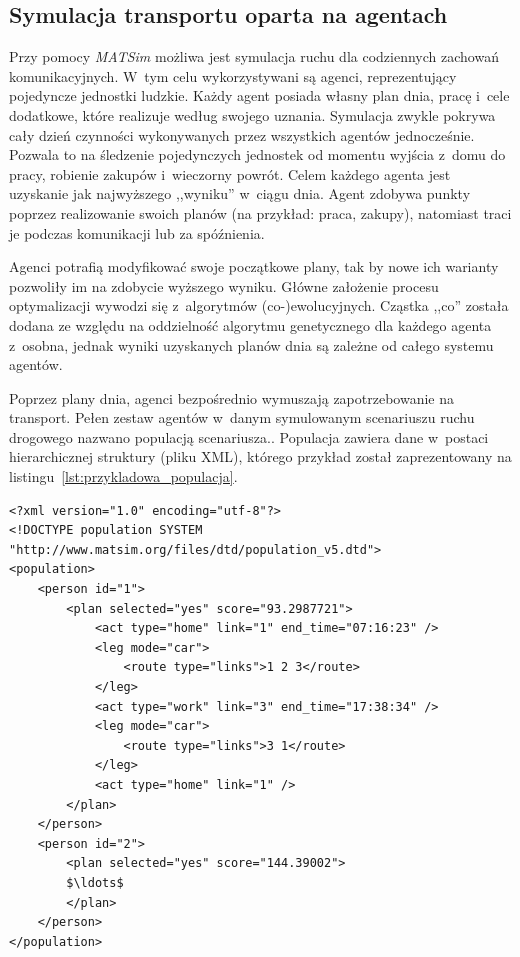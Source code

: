 \documentclass[twoside,12pt]{report}
\begin{document}
\subsection{Symulacja transportu oparta na agentach}\label{rozdz.agenci}
Przy pomocy \textit{MATSim} możliwa jest symulacja ruchu dla codziennych zachowań komunikacyjnych. W~tym celu wykorzystywani są agenci, reprezentujący pojedyncze jednostki ludzkie. Każdy agent posiada własny plan dnia, pracę i~cele dodatkowe, które realizuje według swojego uznania. Symulacja zwykle pokrywa cały dzień czynności wykonywanych przez wszystkich agentów jednocześnie. Pozwala to na śledzenie pojedynczych jednostek od momentu wyjścia z~domu do pracy, robienie zakupów i~wieczorny powrót. Celem każdego agenta jest uzyskanie jak najwyższego ,,wyniku'' w~ciągu dnia. Agent zdobywa punkty poprzez realizowanie swoich planów (na przykład: praca, zakupy), natomiast traci je podczas komunikacji lub za spóźnienia.

Agenci potrafią modyfikować swoje początkowe plany, tak by nowe ich warianty pozwoliły im na zdobycie wyższego wyniku. Główne założenie procesu optymalizacji wywodzi się z~algorytmów (co-)ewolucyjnych. Cząstka ,,co'' została dodana ze względu na oddzielność algorytmu genetycznego dla każdego agenta z~osobna, jednak wyniki uzyskanych planów dnia są zależne od całego systemu agentów. 

Poprzez plany dnia, agenci bezpośrednio wymuszają zapotrzebowanie na transport. Pełen zestaw agentów w~danym symulowanym scenariuszu ruchu drogowego nazwano populacją scenariusza.. Populacja zawiera dane w~postaci hierarchicznej struktury (pliku XML), którego przykład został zaprezentowany na listingu~\ref{lst:przykladowa_populacja}.

\begin{lstlisting}[caption=Przykładowy plik populacji scenariusza zawierający plany dnia agentów, label=lst:przykladowa_populacja, mathescape]
<?xml version="1.0" encoding="utf-8"?>
<!DOCTYPE population SYSTEM "http://www.matsim.org/files/dtd/population_v5.dtd">
<population>
	<person id="1">
		<plan selected="yes" score="93.2987721">
			<act type="home" link="1" end_time="07:16:23" />
			<leg mode="car">
				<route type="links">1 2 3</route>
			</leg>
			<act type="work" link="3" end_time="17:38:34" />
			<leg mode="car">
				<route type="links">3 1</route>
			</leg>
			<act type="home" link="1" />
		</plan>
	</person>
	<person id="2">
		<plan selected="yes" score="144.39002">
		$\ldots$
		</plan>
	</person>
</population>
\end{lstlisting}
\end{document}
